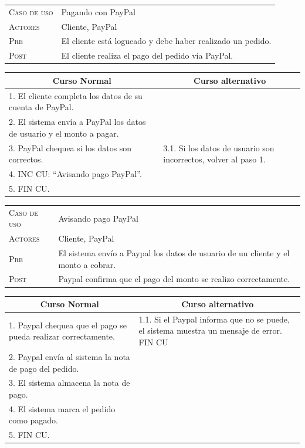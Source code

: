 \begin{tabular}{p{} p{}}
    \textsc{Caso de uso} & Pagando con PayPal \\
    \textsc{Actores} & Cliente, PayPal \\
    \textsc{Pre} & El cliente está logueado y debe haber realizado un pedido.
    \\
    \textsc{Post} & El cliente realiza el pago del pedido vía PayPal. \\
\end{tabular}

\begin{center}
\begin{tabular}{|p{}|p{}|}
    \hline
    \multicolumn{1}{|c|}{Curso Normal} &
    \multicolumn{1}{|c|}{Curso alternativo} \\
    \hline
    1. El cliente completa los datos de su cuenta de PayPal. & \\
    2. El sistema envía a PayPal los datos de usuario y el monto a pagar. & \\
    3. PayPal chequea si los datos son correctos. &
    3.1. Si los datos de usuario son incorrectos, volver al paso 1. \\
    4. INC CU: ``Avisando pago PayPal''. & \\
    5. FIN CU. & \\
    \hline
\end{tabular}
\end{center}


\begin{tabular}{p{} p{}}
    \textsc{Caso de uso} & Avisando pago PayPal \\
    \textsc{Actores} & Cliente, PayPal \\
    \textsc{Pre} & El sistema envío a Paypal los datos de usuario de un cliente y el monto a cobrar. \\
    \textsc{Post} & Paypal confirma que el pago del monto se realizo correctamente. \\
\end{tabular}

\begin{center}
\begin{tabular}{|p{}|p{}|}
    \hline
    \multicolumn{1}{|c|}{Curso Normal} &
    \multicolumn{1}{|c|}{Curso alternativo} \\
    \hline
    1. Paypal chequea que el pago se pueda realizar correctamente. &
    1.1. Si el Paypal informa que no se puede, el sistema muestra un mensaje de error. FIN CU \\
    2. Paypal envía al sistema la nota de pago del pedido. & \\
    3. El sistema almacena la nota de pago. & \\
    4. El sistema marca el pedido como pagado. & \\
    5. FIN CU. & \\
    \hline
\end{tabular}
\end{center}

